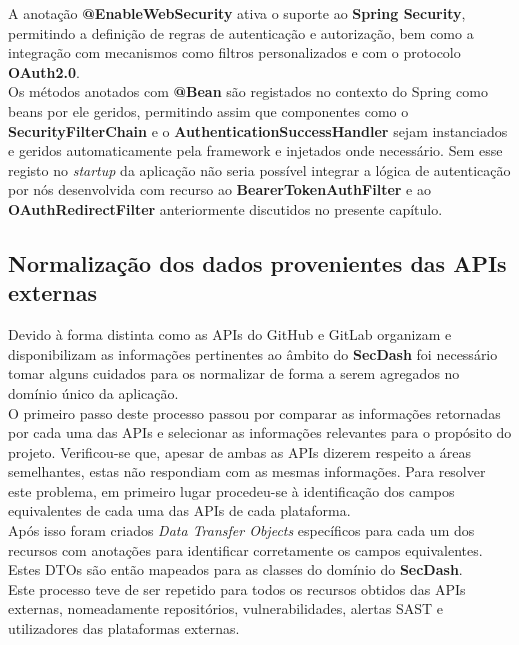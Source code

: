 A anotação \textbf{@EnableWebSecurity} ativa o suporte ao \textbf{Spring Security}, permitindo a definição de regras de autenticação e autorização, bem como a integração com mecanismos como filtros personalizados e com o protocolo \textbf{OAuth2.0}. \\

Os métodos anotados com \textbf{@Bean} são registados no contexto do Spring como beans por ele geridos, permitindo assim que componentes como o \textbf{SecurityFilterChain} e o \textbf{AuthenticationSuccessHandler} sejam instanciados e geridos automaticamente pela framework e injetados onde necessário. Sem esse registo no \textit{startup} da aplicação não seria possível integrar a lógica de autenticação por nós desenvolvida com recurso ao \textbf{BearerTokenAuthFilter} e ao \textbf{OAuthRedirectFilter} anteriormente discutidos no presente capítulo. \\

\subsection{Normalização dos dados provenientes das APIs externas}
Devido à forma distinta como as APIs do GitHub e GitLab organizam e disponibilizam as informações pertinentes ao âmbito do \textbf{SecDash} foi necessário tomar alguns cuidados para os normalizar de forma a serem agregados no domínio único da aplicação. \\

O primeiro passo deste processo passou por comparar as informações retornadas por cada uma das APIs e selecionar as informações relevantes para o propósito do projeto. Verificou-se que, apesar de ambas as APIs dizerem respeito a áreas semelhantes, estas não respondiam com as mesmas informações. Para resolver este problema, em primeiro lugar procedeu-se à identificação dos campos equivalentes de cada uma das APIs de cada plataforma. \\

Após isso foram criados \textit{Data Transfer Objects} específicos para cada um dos recursos com anotações para identificar corretamente os campos equivalentes. Estes DTOs são então mapeados para as classes do domínio do \textbf{SecDash}. \\

Este processo teve de ser repetido para todos os recursos obtidos das APIs externas, nomeadamente repositórios, vulnerabilidades, alertas SAST e utilizadores das plataformas externas. \\

